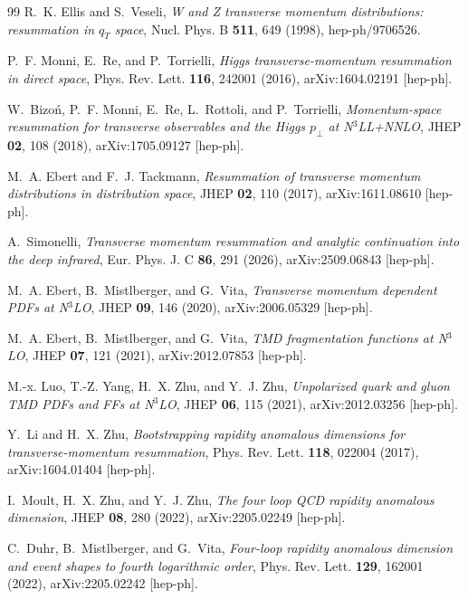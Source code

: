 \documentclass[aps,prd,preprint,superscriptaddress,nofootinbib,longbibliography]{revtex4-2}
\begin{document}
\begin{thebibliography}{99}
R.~K. Ellis and S.~Veseli,
\textit{W and Z transverse momentum distributions: resummation in $q_T$ space},
Nucl. Phys. B \textbf{511}, 649 (1998),
hep-ph/9706526.

P.~F. Monni, E.~Re, and P.~Torrielli,
\textit{Higgs transverse-momentum resummation in direct space},
Phys. Rev. Lett. \textbf{116}, 242001 (2016),
arXiv:1604.02191 [hep-ph].

W.~Bizo\'n, P.~F. Monni, E.~Re, L.~Rottoli, and P.~Torrielli,
\textit{Momentum-space resummation for transverse observables and the Higgs $p_\perp$ at N$^3$LL+NNLO},
JHEP \textbf{02}, 108 (2018),
arXiv:1705.09127 [hep-ph].

M.~A. Ebert and F.~J. Tackmann,
\textit{Resummation of transverse momentum distributions in distribution space},
JHEP \textbf{02}, 110 (2017),
arXiv:1611.08610 [hep-ph].

A.~Simonelli,
\textit{Transverse momentum resummation and analytic continuation into the deep infrared},
Eur. Phys. J. C \textbf{86}, 291 (2026),
arXiv:2509.06843 [hep-ph].

M.~A. Ebert, B.~Mistlberger, and G.~Vita,
\textit{Transverse momentum dependent PDFs at N$^3$LO},
JHEP \textbf{09}, 146 (2020),
arXiv:2006.05329 [hep-ph].

M.~A. Ebert, B.~Mistlberger, and G.~Vita,
\textit{TMD fragmentation functions at N$^3$LO},
JHEP \textbf{07}, 121 (2021),
arXiv:2012.07853 [hep-ph].

M.-x. Luo, T.-Z. Yang, H.~X. Zhu, and Y.~J. Zhu,
\textit{Unpolarized quark and gluon TMD PDFs and FFs at N$^3$LO},
JHEP \textbf{06}, 115 (2021),
arXiv:2012.03256 [hep-ph].

Y.~Li and H.~X. Zhu,
\textit{Bootstrapping rapidity anomalous dimensions for transverse-momentum resummation},
Phys. Rev. Lett. \textbf{118}, 022004 (2017),
arXiv:1604.01404 [hep-ph].

I.~Moult, H.~X. Zhu, and Y.~J. Zhu,
\textit{The four loop QCD rapidity anomalous dimension},
JHEP \textbf{08}, 280 (2022),
arXiv:2205.02249 [hep-ph].

C.~Duhr, B.~Mistlberger, and G.~Vita,
\textit{Four-loop rapidity anomalous dimension and event shapes to fourth logarithmic order},
Phys. Rev. Lett. \textbf{129}, 162001 (2022),
arXiv:2205.02242 [hep-ph].


\end{thebibliography}
\end{document}
